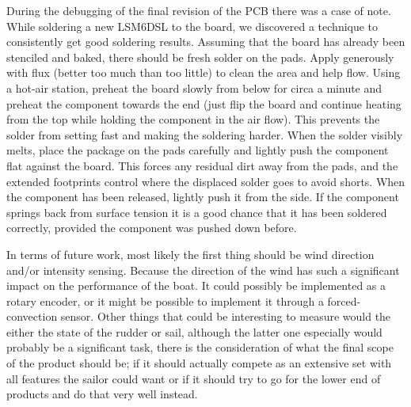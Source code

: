 During the debugging of the final revision of the PCB there was a case of note. While soldering a new LSM6DSL to the board, we discovered a technique to consistently get good soldering results. Assuming that the board has already been stenciled and baked, there should be fresh solder on the pads. Apply generously with flux (better too much than too little) to clean the area and help flow. Using a hot-air station, preheat the board slowly from below for circa a minute and preheat the component towards the end (just flip the board and continue heating from the top while holding the component in the air flow). This prevents the solder from setting fast and making the soldering harder. When the solder visibly melts, place the package on the pads carefully and lightly push the component flat against the board. This forces any residual dirt away from the pads, and the extended footprints control where the displaced solder goes to avoid shorts. When the component has been released, lightly push it from the side. If the component springs back from surface tension it is a good chance that it has been soldered correctly, provided the component was pushed down before. 

In terms of future work, most likely the first thing should be wind direction and/or intensity sensing. Because the direction of the wind has such a significant impact on the performance of the boat. It could possibly be implemented as a rotary encoder, or it might be possible to implement it through a forced-convection sensor\cite{wind_meas}. Other things that could be interesting to measure would the either the state of the rudder or sail, although the latter one especially would probably be a significant task, there is the consideration of what the final scope of the product should be; if it should actually compete as an extensive set with all features the sailor could want or if it should try to go for the lower end of products and do that very well instead. 

